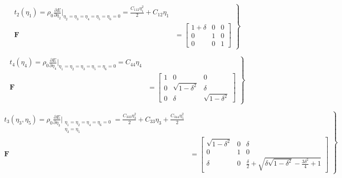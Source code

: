 \documentclass[showpacs,aps,floatfix,prb,reprint,superscriptaddress,onecolumn]{revtex4-1}
\begin{document}
\begin{enumerate}
\begin{equation}
\label{eqn:SM-s6}
  \left.\begin{aligned}
        t_{2} \left(\eta_{1}\right) = \rho_{0} \frac{\partial E}{\partial \eta_{2}}\Bigr|_{\eta_2=\eta_3=\eta_4=\eta_5=\eta_6=0} = \frac{C_{112}\eta_{1}^2}{2} + C_{12}\eta_{1}\\
        \bm{F}&=\begin{bmatrix} 1+\delta & 0 & 0 \\ 0 & 1 & 0 \\ 0 & 0 & 1 \end{bmatrix}
       \end{aligned}
			\right\}
\end{equation}


\begin{equation}
\label{eqn:SM-s7}
  \left.\begin{aligned}
        t_{4} \left(\eta_{4}\right) = \rho_{0} \frac{\partial E}{\partial \eta_{4}}\Bigr|_{\eta_1=\eta_2=\eta_3=\eta_5=\eta_6=0} = C_{44}\eta_{4}\\
        \bm{F}&=\begin{bmatrix} 1 & 0 & 0 \\ 0 & \sqrt{1-\delta^2} & \delta \\ 0 & \delta & \sqrt{1-\delta^2} \end{bmatrix}
       \end{aligned}
			\right\}
\end{equation}



\begin{equation}
\label{eqn:SM-s8}
  \left.\begin{aligned}
        t_{3} \left(\eta_{3}, \eta_{5}\right) = \rho_{0} \frac{\partial E}{\partial \eta_{3}}\Bigr|_{\substack{\eta_1=\eta_2=\eta_4=\eta_6=0\\ \eta_{3}=\eta_{5}}} = \frac{C_{333}\eta_{3}^2}{2} + C_{33}\eta_{3} + \frac{C_{344}\eta_{5}^2}{2}\\
        \bm{F}&=\begin{bmatrix} \sqrt{1-\delta^2} & 0 & \delta \\ 0 & 1 & 0 \\ \delta & 0 & \frac{\delta}{2} + \sqrt{\delta \sqrt{1-\delta^2} - \frac{3 \delta^{2}}{4} + 1} \end{bmatrix}
       \end{aligned}
			\right\}
\end{equation}


\end{enumerate}
\end{document}
